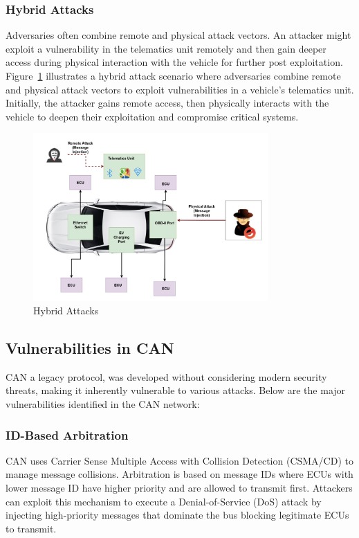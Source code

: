 \documentclass{report}
\begin{document}
\subsubsection{Hybrid Attacks}
Adversaries often combine remote and physical attack vectors.  An attacker might exploit a vulnerability in the telematics unit remotely and then gain deeper access during physical interaction with the vehicle for further post exploitation.
Figure~\ref{fig:Hybrid Attacks}  illustrates a hybrid attack scenario where adversaries combine remote and physical attack vectors to exploit vulnerabilities in a vehicle's telematics unit. Initially, the attacker gains remote access, then physically interacts with the vehicle to deepen their exploitation and compromise critical systems.
\begin{figure}[h]
    \centering
    \includegraphics[width=0.8\textwidth]{figures/hybrid.jpg}
    \caption{Hybrid Attacks}
    \label{fig:Hybrid Attacks}
\end{figure}

\subsection{Vulnerabilities in CAN}
CAN a legacy protocol, was developed without considering modern security threats, making it inherently vulnerable to various attacks. Below are the major vulnerabilities identified in the CAN network:

\subsubsection{ID-Based Arbitration}
CAN uses Carrier Sense Multiple Access with Collision Detection (CSMA/CD) to manage message collisions. Arbitration is based on message IDs where ECUs with lower message ID have higher priority and are allowed to transmit first. Attackers can exploit this mechanism to execute a Denial-of-Service (DoS) attack by injecting high-priority messages that dominate the bus blocking legitimate ECUs to transmit.
\end{document}

